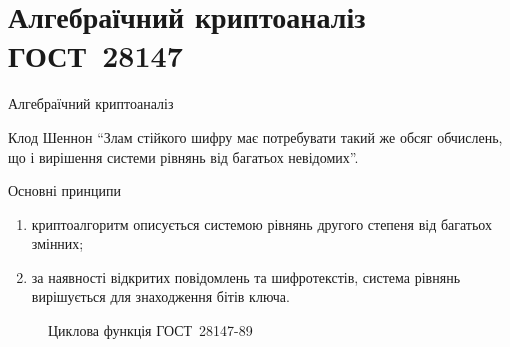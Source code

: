 \documentclass[10pt, ucs, handout]{beamer}
\begin{document}
\section{Алгебраїчний криптоаналіз  ГОСТ~28147}
\begin{frame}{Алгебраїчний криптоаналіз}
    \begin{block}{Клод Шеннон}
        ``Злам стійкого шифру має потребувати такий же обсяг обчислень, що і
        вирішення системи рівнянь від багатьох невідомих''.
    \end{block}
    \begin{minipage}[t]{0.5\textwidth}
        \begin{block}{Основні принципи}
            \begin{enumerate}
                \item криптоалгоритм описується системою рівнянь другого
                    степеня від багатьох змінних;
                \item за наявності відкритих повідомлень та шифротекстів,
                    система рівнянь вирішується для знаходження бітів ключа.
            \end{enumerate}
        \end{block}
    \end{minipage}%
    \hspace*{1ex}
    \begin{minipage}[t]{0.5\textwidth}
        \begin{figure}[htbp]
            \centering
            
            \caption{Циклова функція ГОСТ~28147-89}
        \end{figure}
    \end{minipage}%
\end{frame}
\end{document}

